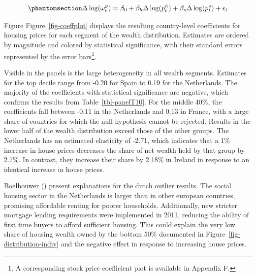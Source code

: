 \documentclass[
  a4paper,
  DIV=11,
  numbers=noendperiod]{scrartcl}
\begin{document}
\begin{equation}\phantomsection\label{eq-indiv}{
\Delta \log (\omega_{t}^g) = \beta_0 + \beta_h \Delta \log (p_{t}^h) + \beta_s \Delta \log(p^s_{t})+ \epsilon_t
}\end{equation}

Figure Figure~\ref{fig-coeffplot} displays the resulting country-level
coefficients for housing prices for each segment of the wealth
distribution. Estimates are ordered by magnitude and colored by
statistical significance, with their standard errors represented by the
error bars\footnote{A corresponding stock price coefficient plot is
  available in Appendix F.}.

Visible in the panels is the large heterogeneity in all wealth segments.
Estimates for the top decile range from -0.20 for Spain to 0.19 for the
Netherlands. The majority of the coefficients with statistical
significance are negative, which confirms the results from
Table~\ref{tbl-panelT10}. For the middle 40\%, the coefficients fall
between -0.11 in the Netherlands and 0.13 in France, with a large share
of countries for which the null hypothesis cannot be rejected. Results
in the lower half of the wealth distribution exceed those of the other
groups. The Netherlands has an estimated elasticity of -2.71, which
indicates that a 1\% increase in house prices decreases the share of net
wealth held by that group by 2.7\%. In contrast, they increase their
share by 2.18\% in Ireland in response to an identical increase in house
prices.

Boelhouwer ()
present explanations for the dutch outlier results. The social housing
sector in the Netherlands is larger than in other european countries,
promising affordable renting for poorer households. Additionally, new
stricter mortgage lending requirements were implemented in 2011,
reducing the ability of first time buyers to afford sufficient housing.
This could explain the very low share of housing wealth owned by the
bottom 50\% documented in Figure~\ref{fig-distribution-indiv} and the
negative effect in response to increasing house prices.
\end{document}
